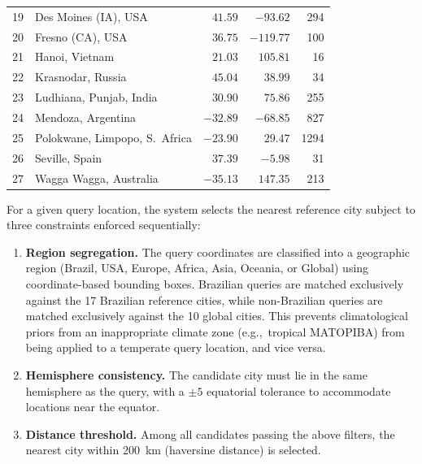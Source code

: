 \documentclass[preprint,review,12pt]{elsarticle}
\begin{document}
\begin{table}[htbp]
\begin{tabular}{@{}rlrrr@{}}
19 & Des Moines (IA), USA       & $41.59$ & $-93.62$ & 294 \\
20 & Fresno (CA), USA           & $36.75$ & $-119.77$ & 100 \\
21 & Hanoi, Vietnam             & $21.03$ & $105.81$ & 16 \\
22 & Krasnodar, Russia          & $45.04$ &  $38.99$ & 34 \\
23 & Ludhiana, Punjab, India    & $30.90$ &  $75.86$ & 255 \\
24 & Mendoza, Argentina         & $-32.89$ & $-68.85$ & 827 \\
25 & Polokwane, Limpopo, S.\ Africa & $-23.90$ & $29.47$ & 1294 \\
26 & Seville, Spain             & $37.39$ &  $-5.98$ & 31 \\
27 & Wagga Wagga, Australia     & $-35.13$ & $147.35$ & 213 \\
\bottomrule
\end{tabular}
\end{table}

For a given query location, the system selects the nearest reference city
subject to three constraints enforced sequentially:

\begin{enumerate}
\item \textbf{Region segregation.} The query coordinates are classified into a
  geographic region (Brazil, USA, Europe, Africa, Asia, Oceania, or Global)
  using coordinate-based bounding boxes. Brazilian queries are matched
  exclusively against the 17 Brazilian reference cities, while non-Brazilian
  queries are matched exclusively against the 10 global cities.  This prevents
  climatological priors from an inappropriate climate zone (e.g.,\ tropical
  MATOPIBA) from being applied to a temperate query location, and vice versa.

\item \textbf{Hemisphere consistency.} The candidate city must lie in the same
  hemisphere as the query, with a $\pm5$\textdegree{} equatorial tolerance to
  accommodate locations near the equator.

\item \textbf{Distance threshold.} Among all candidates passing the above
  filters, the nearest city within 200~km (haversine distance) is selected.
\end{enumerate}
\end{document}
